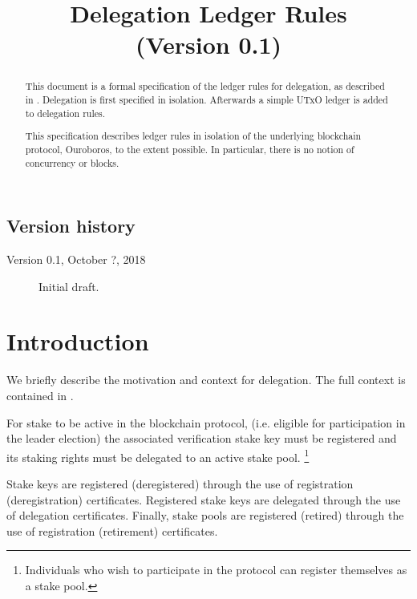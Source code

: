 \documentclass[11pt,a4paper]{article}
\begin{document}
\title{Delegation Ledger Rules \\
       {\small (Version 0.1)}}
\author{}

\maketitle

\begin{abstract}
This document is a formal specification of the ledger rules for delegation,
as described in \cite{delegation_design}.
Delegation is first specified in isolation.
Afterwards a simple UTxO ledger is added to delegation rules.

This specification describes ledger rules in isolation of the
underlying blockchain protocol, Ouroboros, to the extent possible.
In particular, there is no notion of concurrency or blocks.

\end{abstract}

\tableofcontents
\listoffigures

\subsection*{Version history}

\begin{description}
\item[Version 0.1, October ?, 2018] Initial draft.
\end{description}

\section{Introduction}

We briefly describe the motivation and context for delegation.
The full context is contained in \cite{delegation_design}.

For stake to be active in the blockchain protocol,
(i.e. eligible for participation in the leader election)
the associated verification stake key must be registered
and its staking rights must be delegated to an active stake pool.
\footnote{Individuals who wish to participate in the protocol can
register themselves as a stake pool.}

Stake keys are registered (deregistered) through the use of
registration (deregistration) certificates.
Registered stake keys are delegated through the use of delegation certificates.
Finally, stake pools are registered (retired) through the use of
registration (retirement) certificates.
\end{document}
